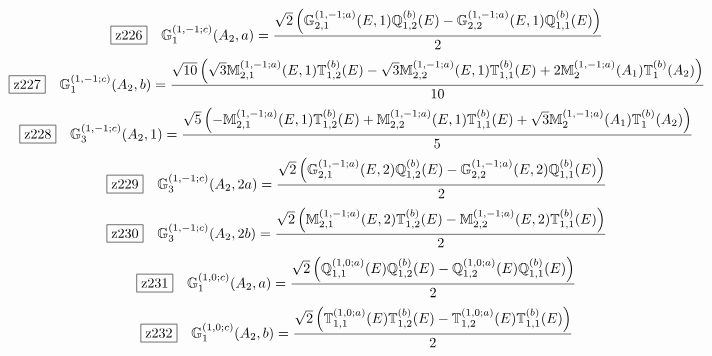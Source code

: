 \documentclass[fleqn,10pt,landscape]{jsarticle}
\begin{document}
\begin{dmath*}
\hspace*{3mm}\fbox{z226}\quad \mathbb{G}_{1}^{(1,-1;c)}(A_{2},a)=\frac{\sqrt{2} \left(\mathbb{G}_{2,1}^{(1,-1;a)}(E,1) \mathbb{Q}_{1,2}^{(b)}(E) - \mathbb{G}_{2,2}^{(1,-1;a)}(E,1) \mathbb{Q}_{1,1}^{(b)}(E)\right)}{2}
\end{dmath*}
\begin{dmath*}
\hspace*{3mm}\fbox{z227}\quad \mathbb{G}_{1}^{(1,-1;c)}(A_{2},b)=\frac{\sqrt{10} \left(\sqrt{3} \mathbb{M}_{2,1}^{(1,-1;a)}(E,1) \mathbb{T}_{1,2}^{(b)}(E) - \sqrt{3} \mathbb{M}_{2,2}^{(1,-1;a)}(E,1) \mathbb{T}_{1,1}^{(b)}(E) + 2 \mathbb{M}_{2}^{(1,-1;a)}(A_{1}) \mathbb{T}_{1}^{(b)}(A_{2})\right)}{10}
\end{dmath*}
\begin{dmath*}
\hspace*{3mm}\fbox{z228}\quad \mathbb{G}_{3}^{(1,-1;c)}(A_{2},1)=\frac{\sqrt{5} \left(- \mathbb{M}_{2,1}^{(1,-1;a)}(E,1) \mathbb{T}_{1,2}^{(b)}(E) + \mathbb{M}_{2,2}^{(1,-1;a)}(E,1) \mathbb{T}_{1,1}^{(b)}(E) + \sqrt{3} \mathbb{M}_{2}^{(1,-1;a)}(A_{1}) \mathbb{T}_{1}^{(b)}(A_{2})\right)}{5}
\end{dmath*}
\begin{dmath*}
\hspace*{3mm}\fbox{z229}\quad \mathbb{G}_{3}^{(1,-1;c)}(A_{2},2a)=\frac{\sqrt{2} \left(\mathbb{G}_{2,1}^{(1,-1;a)}(E,2) \mathbb{Q}_{1,2}^{(b)}(E) - \mathbb{G}_{2,2}^{(1,-1;a)}(E,2) \mathbb{Q}_{1,1}^{(b)}(E)\right)}{2}
\end{dmath*}
\begin{dmath*}
\hspace*{3mm}\fbox{z230}\quad \mathbb{G}_{3}^{(1,-1;c)}(A_{2},2b)=\frac{\sqrt{2} \left(\mathbb{M}_{2,1}^{(1,-1;a)}(E,2) \mathbb{T}_{1,2}^{(b)}(E) - \mathbb{M}_{2,2}^{(1,-1;a)}(E,2) \mathbb{T}_{1,1}^{(b)}(E)\right)}{2}
\end{dmath*}
\begin{dmath*}
\hspace*{3mm}\fbox{z231}\quad \mathbb{G}_{1}^{(1,0;c)}(A_{2},a)=\frac{\sqrt{2} \left(\mathbb{Q}_{1,1}^{(1,0;a)}(E) \mathbb{Q}_{1,2}^{(b)}(E) - \mathbb{Q}_{1,2}^{(1,0;a)}(E) \mathbb{Q}_{1,1}^{(b)}(E)\right)}{2}
\end{dmath*}
\begin{dmath*}
\hspace*{3mm}\fbox{z232}\quad \mathbb{G}_{1}^{(1,0;c)}(A_{2},b)=\frac{\sqrt{2} \left(\mathbb{T}_{1,1}^{(1,0;a)}(E) \mathbb{T}_{1,2}^{(b)}(E) - \mathbb{T}_{1,2}^{(1,0;a)}(E) \mathbb{T}_{1,1}^{(b)}(E)\right)}{2}
\end{dmath*}
\end{document}
